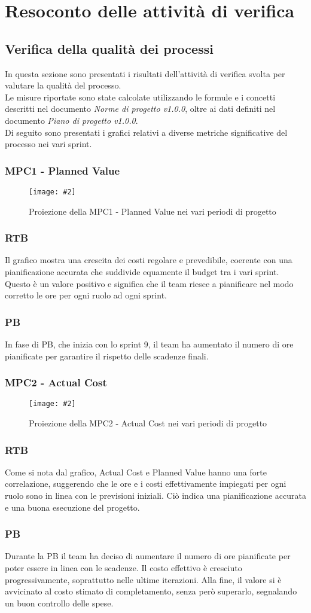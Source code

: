 \newcommand{\Met}[4]{
    \subsubsection{#1}
    \begin{figure}[h!] \centering
        \texttt{[image: \#2]}
        \caption{Proiezione della#1nei vari periodi di progetto}
    \end{figure}
    \subsubsection*{RTB}
    #3
    \subsubsection*{PB}
    #4
    \newpage
}

\section{Resoconto delle attività di verifica}

\subsection{Verifica della qualità dei processi}
In questa sezione sono presentati i risultati dell'attività di verifica svolta per valutare la qualità del processo.\\
Le misure riportate sono state calcolate utilizzando le formule e i concetti descritti nel documento \textit{Norme di progetto v1.0.0}, oltre ai dati definiti nel documento \textit{Piano di progetto v1.0.0}.\\
Di seguito sono presentati i grafici relativi a diverse metriche significative del processo nei vari sprint.

\Met
{ %
    MPC1 - Planned Value
}
{ %
    template/images/PV.png
}
{ %
    Il grafico mostra una crescita dei costi regolare e prevedibile, coerente con una pianificazione accurata che suddivide equamente il budget tra i vari sprint.
    Questo è un valore positivo e significa che il team riesce a pianificare nel modo corretto le ore per ogni ruolo ad ogni sprint.
}
{ %
    In fase di PB, che inizia con lo sprint 9, il team ha aumentato il numero di ore pianificate per garantire il rispetto delle scadenze finali.
}

\Met
{ %
    MPC2 - Actual Cost
}
{ %
    template/images/AC.png
}
{ %
    Come si nota dal grafico, Actual Cost e Planned Value hanno una forte correlazione, suggerendo che le ore e i costi effettivamente impiegati per ogni ruolo sono in linea con le previsioni iniziali.
    Ciò indica una pianificazione accurata e una buona esecuzione del progetto.
}
{ %
    Durante la PB il team ha deciso di aumentare il numero di ore pianificate per poter essere in linea con le scadenze. Il costo effettivo è cresciuto progressivamente, soprattutto nelle ultime iterazioni. Alla fine, il valore si è avvicinato al costo stimato di completamento, senza però superarlo, segnalando un buon controllo delle spese.

}

